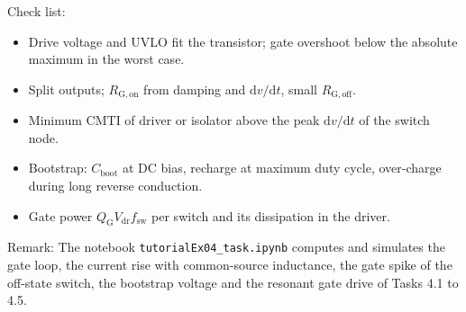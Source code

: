\begin{solutionblock}
	Check list:
	\begin{itemize}
		\item Drive voltage and UVLO fit the transistor; gate overshoot below the absolute maximum in the worst case.
		\item Split outputs; $R_\mathrm{G,on}$ from damping and $\mathrm{d}v/\mathrm{d}t$, small $R_\mathrm{G,off}$.
		\item Minimum CMTI of driver or isolator above the peak $\mathrm{d}v/\mathrm{d}t$ of the switch node.
		\item Bootstrap: $C_\mathrm{boot}$ at DC bias, recharge at maximum duty cycle, over-charge during long reverse conduction.
		\item Gate power $Q_\mathrm{G}V_\mathrm{dr}f_\mathrm{sw}$ per switch and its dissipation in the driver.
	\end{itemize}
\end{solutionblock}

\vspace{0.5cm}
Remark: The notebook \texttt{tutorialEx04\_task.ipynb} computes and simulates the gate loop, the current rise with common-source inductance, the gate spike of the off-state switch, the bootstrap voltage and the resonant gate drive of Tasks 4.1 to 4.5.
